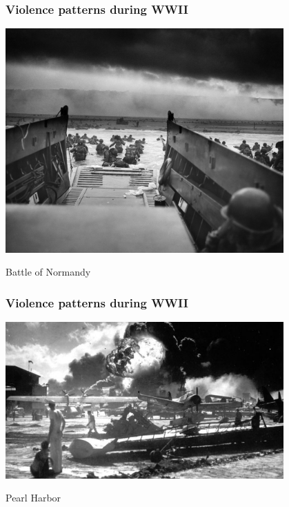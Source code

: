 \documentclass[utf8, xcolor=dvipsnames, handout]{beamer}
\begin{document}
\begin{frame}
\frametitle{Violence patterns during WWII}
\centering

\includegraphics[width = 0.8\textwidth]{img/wwii-normandy}

Battle of Normandy

\end{frame}

\begin{frame}
\frametitle{Violence patterns during WWII}
\centering

\includegraphics[width = 0.8\textwidth]{img/wwii-pearlharbor}

Pearl Harbor

\end{frame}
\end{document}
